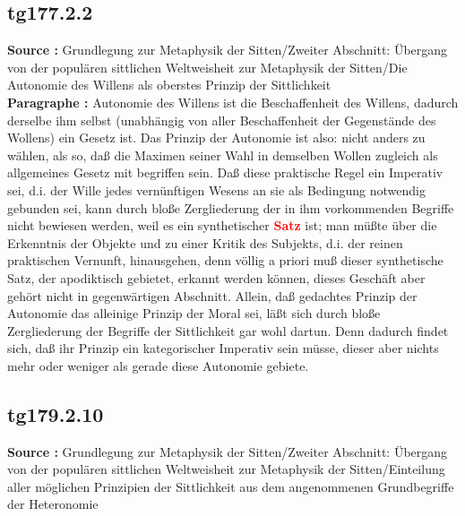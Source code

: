 \documentclass[a4paper,12pt,twoside]{book}
\newcommand{\match}[1]{\textcolor{red}{\textbf{#1}}}
\begin{document}
	\subsection*{tg177.2.2} 
	\textbf{Source : }Grundlegung zur Metaphysik der Sitten/Zweiter Abschnitt: Übergang von der populären sittlichen Weltweisheit zur Metaphysik der Sitten/Die Autonomie des Willens als oberstes Prinzip der Sittlichkeit\\  
	
	\noindent\textbf{Paragraphe : }Autonomie des Willens ist die Beschaffenheit des Willens, dadurch derselbe ihm selbst (unabhängig von aller Beschaffenheit der Gegenstände des Wollens) ein Gesetz ist. Das Prinzip der Autonomie ist also: nicht anders zu wählen, als so, daß die Maximen seiner Wahl in demselben Wollen  zugleich als allgemeines Gesetz mit begriffen sein. Daß diese praktische Regel ein Imperativ sei, d.i. der Wille jedes vernünftigen Wesens an sie als Bedingung notwendig gebunden sei, kann durch bloße Zergliederung der in ihm vorkommenden Begriffe nicht bewiesen werden, weil es ein synthetischer \match{Satz} ist; man müßte über die Erkenntnis der Objekte und zu einer Kritik des Subjekts, d.i. der reinen praktischen Vernunft, hinausgehen, denn völlig a priori muß dieser synthetische Satz, der apodiktisch gebietet, erkannt werden können, dieses Geschäft aber gehört nicht in gegenwärtigen Abschnitt. Allein, daß gedachtes Prinzip der Autonomie das alleinige Prinzip der Moral sei, läßt sich durch bloße Zergliederung der Begriffe der Sittlichkeit gar wohl dartun. Denn dadurch findet sich, daß ihr Prinzip ein kategorischer Imperativ sein müsse, dieser aber nichts mehr oder weniger als gerade diese Autonomie gebiete. 
	
	\subsection*{tg179.2.10} 
	\textbf{Source : }Grundlegung zur Metaphysik der Sitten/Zweiter Abschnitt: Übergang von der populären sittlichen Weltweisheit zur Metaphysik der Sitten/Einteilung aller möglichen Prinzipien der Sittlichkeit aus dem angenommenen Grundbegriffe der Heteronomie\\  
	
\end{document}
